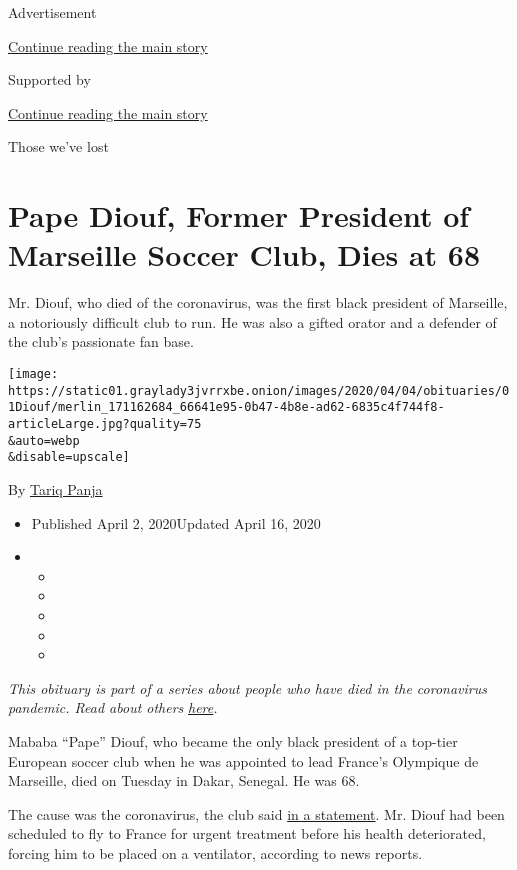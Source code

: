 Advertisement

\protect\hyperlink{after-top}{Continue reading the main story}

Supported by

\protect\hyperlink{after-sponsor}{Continue reading the main story}

Those we've lost

\hypertarget{pape-diouf-former-president-of-marseille-soccer-club-dies-at-68}{%
\section{Pape Diouf, Former President of Marseille Soccer Club, Dies at
68}\label{pape-diouf-former-president-of-marseille-soccer-club-dies-at-68}}

Mr. Diouf, who died of the coronavirus, was the first black president of
Marseille, a notoriously difficult club to run. He was also a gifted
orator and a defender of the club's passionate fan base.

\texttt{[image: https://static01.graylady3jvrrxbe.onion/images/2020/04/04/obituaries/01Diouf/merlin\_171162684\_66641e95-0b47-4b8e-ad62-6835c4f744f8-articleLarge.jpg?quality=75\\\&auto=webp\\\&disable=upscale]}

By \href{https://www.nytimes3xbfgragh.onion/by/tariq-panja}{Tariq Panja}

\begin{itemize}
\item
  Published April 2, 2020Updated April 16, 2020
\item
  \begin{itemize}
  \item
  \item
  \item
  \item
  \item
  \end{itemize}
\end{itemize}

\emph{This obituary is part of a series about people who have died in
the coronavirus pandemic. Read about others}
\href{https://www.nytimes3xbfgragh.onion/series/people-who-have-died-of-the-coronavirus}{\emph{here}}\emph{.}

Mababa ``Pape'' Diouf, who became the only black president of a top-tier
European soccer club when he was appointed to lead France's Olympique de
Marseille, died on Tuesday in Dakar, Senegal. He was 68.

The cause was the coronavirus, the club said
\href{https://www.om.fr/fr/actualites/4808/le-club/34241-pape-diouf-sest-eteint}{in
a statement}. Mr. Diouf had been scheduled to fly to France for urgent
treatment before his health deteriorated, forcing him to be placed on a
ventilator, according to news reports.

